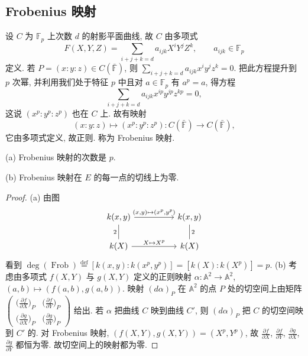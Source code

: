 \subsection*{Frobenius 映射}

设 $C$ 为 $\mathbb{F}_p$ 上次数 $d$ 的射影平面曲线, 故 $C$ 由多项式
\[
F(X, Y, Z) = \sum_{i+j+k=d}a_{ijk}X^iY^jZ^k, \qquad a_{ijk}\in\mathbb{F}_p
\]
定义. 若 $P = (x:y:z)\in C(\bar{\mathbb{F}})$, 则 $\sum_{i+j+k=d}a_{ijk}x^iy^jz^k = 0$. 把此方程提升到 $p$ 次幂, 并利用我们处于特征 $p$ 中且对 $a\in\mathbb{F}_p$ 有 $a^p = a$, 得方程
\[
\sum_{i+j+k=d}a_{ijk}x^{ip}y^{jp}z^{kp} = 0,
\]
这说 $(x^p:y^p:z^p)$ 也在 $C$ 上. 故有映射
\[
(x:y:z)\mapsto(x^p:y^p:z^p)\colon C(\bar{\mathbb{F}})\to C(\bar{\mathbb{F}}),
\]
它由多项式定义, 故正则. 称为 Frobenius 映射.

\begin{proposition} \label{thm:4.9.1} 
(a) Frobenius 映射的次数是 $p$.

(b) Frobenius 映射在 $E$ 的每一点的切线上为零.
\end{proposition}

\begin{proof}
(a) 由图
\[\begin{tikzcd}
	{k(x,y)} && {k(x,y)} \\
	{k(X)} && {k(X)}
	\arrow["{(x,y)\mapsto(x^p,y^p)}", from=1-1, to=1-3]
	\arrow["2"', no head, from=1-1, to=2-1]
	\arrow["2", no head, from=1-3, to=2-3]
	\arrow["{X\mapsto X^p}", from=2-1, to=2-3]
\end{tikzcd}\]
看到 $\deg(\operatorname{Frob}) \overset{\text{def}}{=} [k(x,y):k(x^p,y^p)] = [k(X):k(X^p)] = p$.
(b) 考虑由多项式 $f(X, Y)$ 与 $g(X, Y)$ 定义的正则映射 $\alpha\colon\mathbb{A}^2\to\mathbb{A}^2$, $(a, b)\mapsto(f(a, b), g(a, b))$. 映射 $(d\alpha)_P$ 在 $\mathbb{A}^2$ 的点 $P$ 处的切空间上由矩阵$\begin{pmatrix}
\bigl(\frac{\partial f}{\partial X}\bigr)_P & \bigl(\frac{\partial f}{\partial Y}\bigr)_P\\
\bigl(\frac{\partial g}{\partial X}\bigr)_P & \bigl(\frac{\partial g}{\partial Y}\bigr)_P
\end{pmatrix}$
给出. 若 $\alpha$ 把曲线 $C$ 映到曲线 $C'$, 则 $(d\alpha)_P$ 把 $C$ 的切空间映到 $C'$ 的. 对 Frobenius 映射, $(f(X, Y), g(X, Y)) = (X^p, Y^p)$, 故 $\frac{\partial f}{\partial X}$, $\frac{\partial f}{\partial Y}$, $\frac{\partial g}{\partial X}$, $\frac{\partial g}{\partial Y}$ 都恒为零. 故切空间上的映射都为零.
\end{proof}

